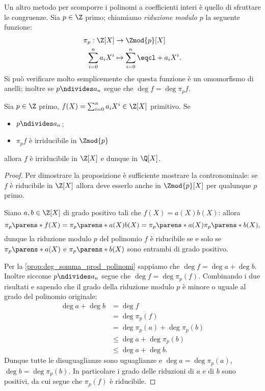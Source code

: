 Un altro metodo per scomporre i polinomi a coefficienti interi è quello di sfruttare le congruenze. Sia $p \in \Z$ primo; chiamiamo \emph{riduzione modulo $p$} la seguente funzione:
\begin{align*}
    \pi_p : \Z[X] &\to \Zmod{p}[X]\\
    \sum_{i=0}^n a_iX^i &\mapsto \sum_{i=0}^n \eqcl+{a_i}X^i.
\end{align*}
Si può verificare molto semplicemente che questa funzione è un omomorfismo di anelli; inoltre se $p \ndivides a_n$ segue che $\deg f = \deg \pi_p f$.

\begin{proposition}
    Sia $p \in \Z$ primo, $f(X) = \sum_{i=0}^n a_iX^i \in \Z[X]$ primitivo. Se \begin{itemize}
        \item $p \ndivides a_n$;
        \item $\pi_p f$ è irriducibile in $\Zmod{p}$
    \end{itemize} allora $f$ è irriducibile in $\Z[X]$ e dunque in $\Q[X]$.
\end{proposition}
\begin{proof}
    Per dimostrare la proposizione è sufficiente mostrare la contronominale: se $f$ è riducibile in $\Z[X]$ allora deve esserlo anche in $\Zmod{p}[X]$ per qualunque $p$ primo.

    Siano $a, b \in \Z[X]$ di grado positivo tali che $f(X) = a(X)b(X)$: allora \[
        \pi_p\parens*{f(X)} = \pi_p\parens*{a(X)b(X)} = \pi_p\parens*{a(X)}\pi_p\parens*{b(X)},
    \] dunque la riduzione modulo $p$ del polinomio $f$ è riducibile se e solo se $\pi_p\parens*{a(X)}$ e $\pi_p\parens*{b(X)}$ sono entrambi di grado positivo.

    Per la \autoref{prop:deg_somma_prod_polinomi} sappiamo che $\deg f = \deg a + \deg b$. Inoltre siccome $p \ndivides a_n$ segue che $\deg f = \deg \pi_p(f)$. Combinando i due risultati e sapendo che il grado della riduzione modulo $p$ è minore o uguale al grado del polinomio originale: \begin{align*}
        \deg a + \deg b &= \deg f \\
        &= \deg \pi_p(f) \\
        &= \deg \pi_p(a) + \deg \pi_p(b)\\
        &\leq \deg a + \deg \pi_p(b) \\
        &\leq \deg a + \deg b.
    \end{align*} Dunque tutte le disuguaglianze sono uguaglianze e $\deg a = \deg \pi_p(a)$, $\deg b = \deg \pi_p(b)$. In particolare i grado delle riduzioni di $a$ e di $b$ sono positivi, da cui segue che $\pi_p(f)$ è riducibile.
\end{proof}


